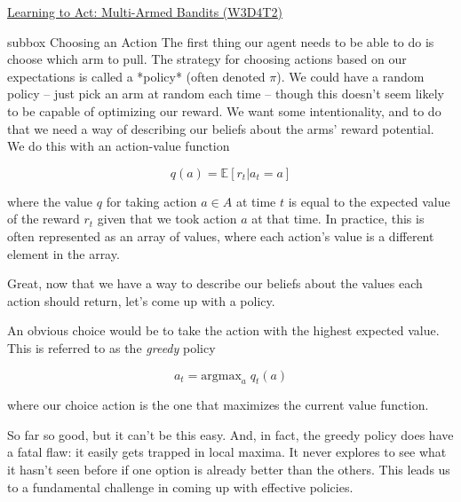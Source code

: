 \begin{textbox}{\href{https://compneuro.neuromatch.io/tutorials/W3D4_ReinforcementLearning/student/W3D4_Tutorial2.html}{Learning to Act: Multi-Armed Bandits (W3D4T2)} }
\begin{subbox}{subbox}{ Choosing an Action}
\scriptsize
The first thing our agent needs to be able to do is choose which arm to pull. The strategy for choosing actions based on our expectations is called a *policy* (often denoted $\pi$). We could have a random policy -- just pick an arm at random each time -- though this doesn't seem likely to be capable of optimizing our reward. We want some intentionality, and to do that we need a way of describing our beliefs about the arms' reward potential. We do this with an action-value function

\begin{equation}
q(a) = \mathbb{E} [r_{t} | a_{t} = a]
\end{equation}

where the value $q$ for taking action $a \in A$ at time $t$ is equal to the expected value of the reward $r_t$ given that we took action $a$ at that time. In practice, this is often represented as an array of values, where each action's value is a different element in the array.

Great, now that we have a way to describe our beliefs about the values each action should return, let's come up with a policy.

An obvious choice would be to take the action with the highest expected value. This is referred to as the \textit{greedy} policy

\begin{equation}
a_{t} = \text{argmax}_{a} \; q_{t} (a)
\end{equation}

where our choice action is the one that maximizes the current value function.

So far so good, but it can't be this easy. And, in fact, the greedy policy does have a fatal flaw: it easily gets trapped in local maxima. It never explores to see what it hasn't seen before if one option is already better than the others. This leads us to a fundamental challenge in coming up with effective policies.

\end{subbox}

\end{textbox}
